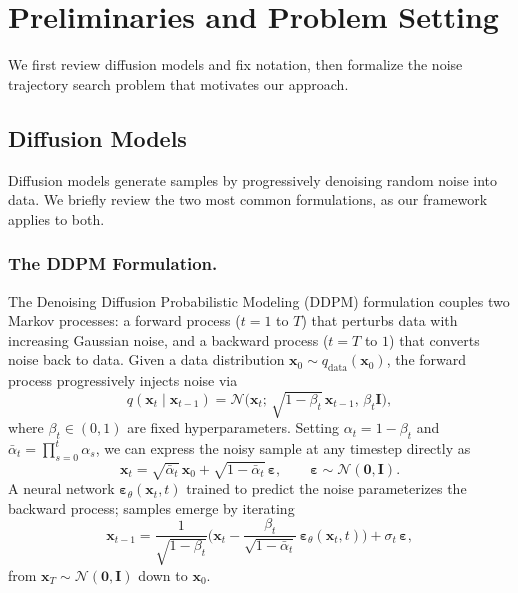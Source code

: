 \section{Preliminaries and Problem Setting}
\label{sec:preliminaries}

We first review diffusion models and fix notation, then formalize the
noise trajectory search problem that motivates our approach.

\subsection{Diffusion Models}
\label{sec:diffusion-models}

Diffusion models generate samples by progressively denoising random noise into
data.
We briefly review the two most common formulations, as our framework applies to
both.

\subsubsection{The DDPM Formulation.}
The Denoising Diffusion Probabilistic Modeling (DDPM) formulation
\citep{ho2020denoising} couples two Markov processes: a forward process
($t = 1$ to $T$) that perturbs data with increasing Gaussian
noise, and a backward process ($t = T$ to $1$) that converts noise back
to data.
Given a data distribution $\mathbf{x}_0 \sim q_{\mathrm{data}}(\mathbf{x}_0)$,
the forward process progressively injects noise via
\begin{equation}
  q(\mathbf{x}_t \mid \mathbf{x}_{t-1})
  = \mathcal{N}\bigl(\mathbf{x}_t;\, \sqrt{1 - \beta_t}\,\mathbf{x}_{t-1},\,
    \beta_t \mathbf{I}\bigr),
  \label{eq:ddpm-forward}
\end{equation}
where $\beta_t \in (0,1)$ are fixed hyperparameters.
Setting $\alpha_t = 1 - \beta_t$ and
$\bar{\alpha}_t = \prod_{s=0}^{t}\alpha_s$, we can express the noisy sample at
any timestep directly as
\begin{equation}
  \mathbf{x}_t
  = \sqrt{\bar{\alpha}_t}\,\mathbf{x}_0
    + \sqrt{1 - \bar{\alpha}_t}\,\boldsymbol{\varepsilon},
  \qquad \boldsymbol{\varepsilon} \sim \mathcal{N}(\mathbf{0}, \mathbf{I}).
  \label{eq:ddpm-xt}
\end{equation}
A neural network
$\boldsymbol{\varepsilon}_\theta(\mathbf{x}_t, t)$ trained to predict the noise
parameterizes the backward process; samples emerge by iterating
\begin{equation}
  \mathbf{x}_{t-1}
  = \frac{1}{\sqrt{1 - \beta_t}}
    \biggl(\mathbf{x}_t - \frac{\beta_t}{\sqrt{1 - \bar{\alpha}_t}}\,
    \boldsymbol{\varepsilon}_\theta(\mathbf{x}_t, t)\biggr)
    + \sigma_t\,\boldsymbol{\varepsilon},
  \label{eq:ddpm-reverse}
\end{equation}
from $\mathbf{x}_T \sim \mathcal{N}(\mathbf{0}, \mathbf{I})$ down to
$\mathbf{x}_0$.

